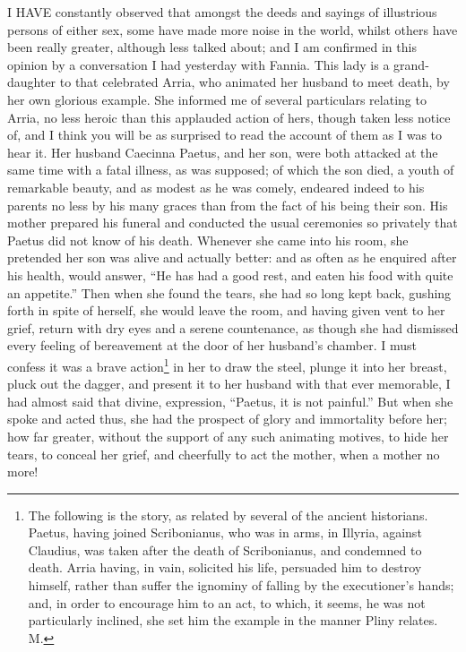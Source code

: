 
I HAVE constantly observed that amongst the deeds and sayings of
illustrious persons of either sex, some have made more noise in the world,
whilst others have been really greater, although less talked about; and I
am confirmed in this opinion by a conversation I had yesterday with
Fannia. This lady is a grand-daughter to that celebrated Arria, who
animated her husband to meet death, by her own glorious example. She
informed me of several particulars relating to Arria, no less heroic than
this applauded action of hers, though taken less notice of, and I think
you will be as surprised to read the account of them as I was to hear it.
Her husband Caecinna Paetus, and her son, were both attacked at the same
time with a fatal illness, as was supposed; of which the son died, a youth
of remarkable beauty, and as modest as he was comely, endeared indeed to
his parents no less by his many graces than from the fact of his being
their son. His mother prepared his funeral and conducted the usual
ceremonies so privately that Paetus did not know of his death. Whenever
she came into his room, she pretended her son was alive and actually
better: and as often as he enquired after his health, would answer, ``He
has had a good rest, and eaten his food with quite an appetite.'' Then when
she found the tears, she had so long kept back, gushing forth in spite of
herself, she would leave the room, and having given vent to her grief,
return with dry eyes and a serene countenance, as though she had dismissed
every feeling of bereavement at the door of her husband's chamber. I must
confess it was a brave action\footnote{The following is the
story, as related by several of the ancient historians. Paetus, having
joined Scribonianus, who was in arms, in Illyria, against Claudius, was
taken after the death of Scribonianus, and condemned to death. Arria
having, in vain, solicited his life, persuaded him to destroy himself,
rather than suffer the ignominy of falling by the executioner's hands;
and, in order to encourage him to an act, to which, it seems, he was not
particularly inclined, she set him the example in the manner Pliny
relates. M.} in her to draw the steel, plunge it into her
breast, pluck out the dagger, and present it to her husband with that ever
memorable, I had almost said that divine, expression, ``Paetus, it is not
painful.'' But when she spoke and acted thus, she had the prospect of glory
and immortality before her; how far greater, without the support of any
such animating motives, to hide her tears, to conceal her grief, and
cheerfully to act the mother, when a mother no more!

